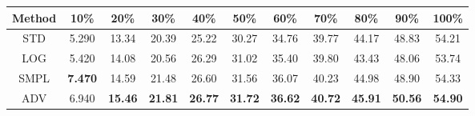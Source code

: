 \documentclass{standalone}
\begin{document}
\begin{tabular}{c|cccccccccc}
      \toprule
      Method & 10\% & 20\% & 30\% & 40\% & 50\% & 60\% & 70\% & 80\% & 90\% & 100\% \\
      \midrule
STD & 5.290 & 13.34 & 20.39 & 25.22 & 30.27 & 34.76 & 39.77 & 44.17 & 48.83 & 54.21\\
LOG & 5.420 & 14.08 & 20.56 & 26.29 & 31.02 & 35.40 & 39.80 & 43.43 & 48.06 & 53.74\\
SMPL & \textbf{7.470} & 14.59 & 21.48 & 26.60 & 31.56 & 36.07 & 40.23 & 44.98 & 48.90 & 54.33\\
ADV & 6.940 & \textbf{15.46} & \textbf{21.81} & \textbf{26.77} & \textbf{31.72} & \textbf{36.62} & \textbf{40.72} & \textbf{45.91} & \textbf{50.56} & \textbf{54.90}\\
  \bottomrule
\end{tabular}
\end{document}
